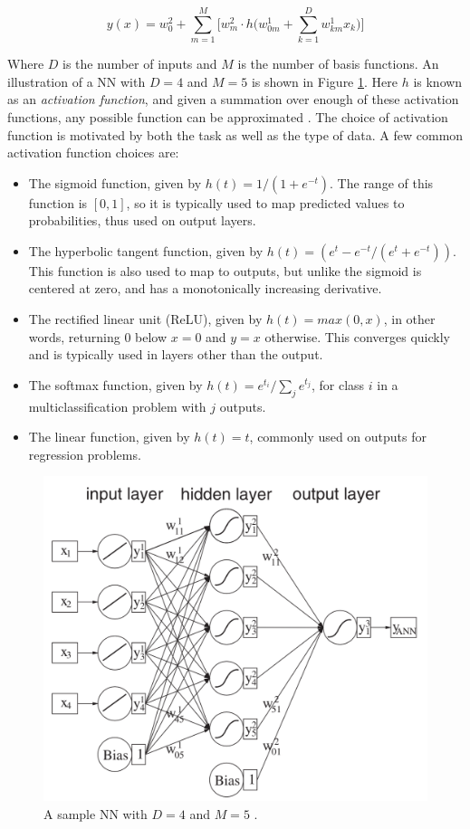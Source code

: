 \begin{equation}
    y(x) = w_0^2 + \sum_{m=1}^{M} \big [w_m^2 \cdot h \big (w_{0m}^1 + \sum_{k=1}^{D} w_{km}^1 x_k) ]
\end{equation}

Where $D$ is the number of inputs and $M$ is the number of basis functions. An illustration of a \gls{NN} with $D=4$ and $M=5$ is shown in Figure \ref{fig:nn}. Here $h$ is known as an \textit{activation function}, and given a summation over enough of these activation functions, any possible function can be approximated \cite{nn-basis}. The choice of activation function is motivated by both the task as well as the type of data. A few common activation function choices are:
\begin{itemize}
    \item The sigmoid function, given by $h(t) = 1/(1+e^{-t})$. The range of this function is $[0,1]$, so it is typically used to map predicted values to probabilities, thus used on output layers.
    \item The hyperbolic tangent function, given by $h(t) = (e^t - e^{-t}/(e^t + e^{-t}))$. This function is also used to map to outputs, but unlike the sigmoid is centered at zero, and has a monotonically increasing derivative.
    \item The rectified linear unit (ReLU), given by $h(t)=max(0,x)$, in other words, returning 0 below $x=0$ and $y=x$ otherwise. This converges quickly and is typically used in layers other than the output.
    \item The softmax function, given by $h(t) = e^{t_i} / \sum\limits_{j} e^{t_j}$, for class $i$ in a multiclassification problem with $j$ outputs.
    \item The linear function, given by $h(t) = t$, commonly used on outputs for regression problems.
\end{itemize}

\begin{figure}[!ht] 
    \centering
    \includegraphics[width=.7\textwidth]{appendices/images/neural_network.png}
    \caption[A sample \gls{NN} with $D=4$ and $M=5$]{A sample \gls{NN} with $D=4$ and $M=5$ \cite{data-analysis}.}
    \label{fig:nn}
\end{figure}

